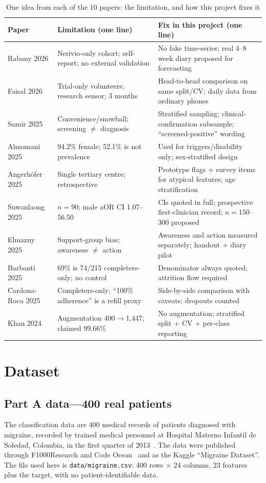 \documentclass[conference]{IEEEtran}
\begin{document}
\begin{table}[t]
\centering
\caption{One idea from each of the 10 papers: the limitation, and how this project fixes it}
\label{tab:papers}
\footnotesize
\begin{tabular}{p{2.6cm}p{5.2cm}p{6.4cm}}
\toprule
Paper & Limitation (one line) & Fix in this project (one line) \\
\midrule
Rabany 2026 & Nerivio-only cohort; self-report; no external validation & No fake time-series; real 4--8 week diary proposed for forecasting \\
Faisal 2026 & Trial-only volunteers; research sensor; 3 months & Head-to-head comparison on same split/CV; daily data from ordinary phones \\
Samir 2025 & Convenience/snowball; screening $\neq$ diagnosis & Stratified sampling; clinical-confirmation subsample; ``screened-positive'' wording \\
Almomani 2025 & 94.2\% female; 52.1\% is not prevalence & Used for triggers/disability only; sex-stratified design \\
Angerh\"ofer 2025 & Single tertiary centre; retrospective & Prototype flags + survey items for atypical features; age stratification \\
Suwanlaong 2025 & $n=90$; male aOR CI 1.07--56.50 & CIs quoted in full; prospective first-clinician record; $n=150$--300 proposed \\
Elmazny 2025 & Support-group bias; awareness $\neq$ action & Awareness and action measured separately; handout + diary pilot \\
Barbanti 2025 & 69\% is 74/215 completers-only; no control & Denominator always quoted; attrition flow required \\
Cardona-Roca 2025 & Completers-only; ``100\% adherence'' is a refill proxy & Side-by-side comparison with caveats; dropouts counted \\
Khan 2024 & Augmentation 400$\rightarrow$1,447; claimed 99.66\% & No augmentation; stratified split + CV + per-class reporting \\
\bottomrule
\end{tabular}
\end{table}

\section{Dataset}
\subsection{Part A data---400 real patients}
The classification data are 400 medical records of patients diagnosed with migraine, recorded by trained medical personnel at Hospital Materno Infantil de Soledad, Colombia, in the first quarter of 2013~\cite{delahoz2014}. The data were published through F1000Research and Code Ocean~\cite{sanchez2020} and as the Kaggle ``Migraine Dataset''. The file used here is \texttt{data/migraine.csv}: 400 rows $\times$ 24 columns, 23 features plus the target, with no patient-identifiable data.
\end{document}
